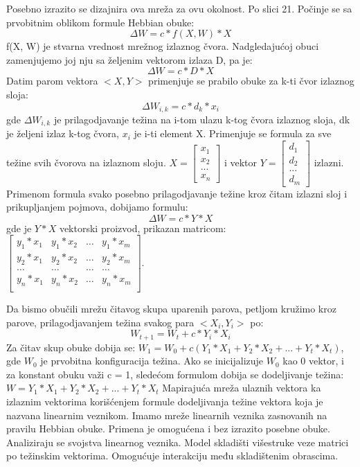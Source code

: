 \documentclass[fontsize=11bp, paper=a4]{scrarticle}
\begin{document}
Posebno izrazito se dizajnira ova mreža za ovu okolnost. Po slici 21.
Počinje se sa prvobitnim oblikom formule Hebbian obuke:
$$
\Delta W = c * f(X,W) * X
$$
f(X, W) je stvarna vrednost mrežnog izlaznog čvora. Nadgledajućoj obuci zamenjujemo joj nju sa željenim vektorom izlaza D, pa je:
$$
\Delta W = c * D * X
$$
Datim parom vektora $<X, Y>$ primenjuje se prabilo obuke za k-ti čvor izlaznog sloja:
$$
\Delta W_{i,k} = c*d_k*x_i
$$
gde $\Delta W_{i,k}$ je prilagodjavanje težina na i-tom ulazu k-tog čvora izlaznog sloja, dk je željeni izlaz k-tog čvora, $x_i$ je i-ti element X. Primenjuje se formula za sve težine svih čvorova na izlaznom sloju. $X = \begin{bmatrix}
    x_1 \\ x_2 \\ ... \\ x_n
\end{bmatrix}$ i vektor $Y = \begin{bmatrix}
    d_1 \\ d_2 \\ ... \\ d_m
\end{bmatrix}$ izlazni.
Primenom formula svako posebno prilagodjavanje težine kroz čitam izlazni sloj i prikupljanjem pojmova, dobijamo formulu:
$$
\Delta W = c * Y * X
$$
gde je $Y*X$ vektorski proizvod, prikazan matricom:
$
\begin{bmatrix}
    y_1*x_1 & y_1*x_2 & \dots & y_1*x_m \\
    y_2*x_1 & y_2*x_2 & \dots & y_2*x_m \\
    \dots   & \dots   & \dots & \dots \\
    y_n*x_1 & y_n*x_2 & \dots & y_n*x_m \\
\end{bmatrix}
$.

Da bismo obučili mrežu čitavog skupa uparenih parova, petljom kružimo kroz parove, prilagodjavanjem težina svakog para $<X_i, Y_i>$ po:
$$ W_{t + 1} = W_t + c*Y_i*X_i$$
Za čitav skup obuke dobija se:
$
W_1 = W_0 + c (Y_1* X_1 + Y_2 * X_2 + ... + Y_t * X_t)
$,
gde $W_0$ je prvobitna konfiguracija težina. Ako se inicijalizuje $W_0$ kao 0 vektor, i za konstant obuku važi c = 1, sledećom formulom dobija se dodeljivanje težina:
$ W = Y_1* X_1 + Y_2 * X_2 + ... + Y_t * X_t$
Mapirajuća mreža ulaznih vektora ka izlaznim vektorima korišćenjem formule dodeljivanja težine vektora koja je nazvana linearnim veznikom. Imamo mreže linearnih veznika zasnovanih na pravilu Hebbian obuke. Primena je omogućena i bez izrazito posebne obuke. Analiziraju se svojstva linearnog veznika. Model skladišti višestruke veze matrici po težinskim vektorima. Omogućuje interakciju među skladištenim obrascima. 
\end{document}
